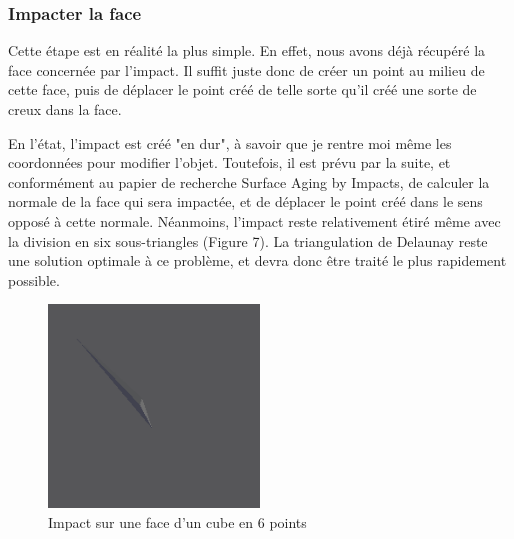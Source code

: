 \documentclass[a4paper,french]{report}
\begin{document}
				\subsubsection{Impacter la face}
					Cette étape est en réalité la plus simple. En effet, nous avons déjà récupéré la face concernée par l'impact. Il suffit juste donc de créer un point au milieu de cette face, puis de déplacer le point créé de telle sorte qu'il créé une sorte de creux dans la face. \par
					En l'état, l'impact est créé "en dur", à savoir que je rentre moi même les coordonnées pour modifier l'objet. Toutefois, il est prévu par la suite, et conformément au papier de recherche Surface Aging by Impacts, de calculer la normale de la face qui sera impactée, et de déplacer le point créé dans le sens opposé à cette normale.
					Néanmoins, l'impact reste relativement étiré même avec la division en six sous-triangles (Figure 7). La triangulation de Delaunay reste une solution optimale à ce problème, et devra donc être traité le plus rapidement possible.
					\begin{figure}[h]
						\centering
						\includegraphics[width=0.5\textwidth]{impact2.png}
						\caption{Impact sur une face d'un cube en 6 points}
					\end{figure}
\end{document}
